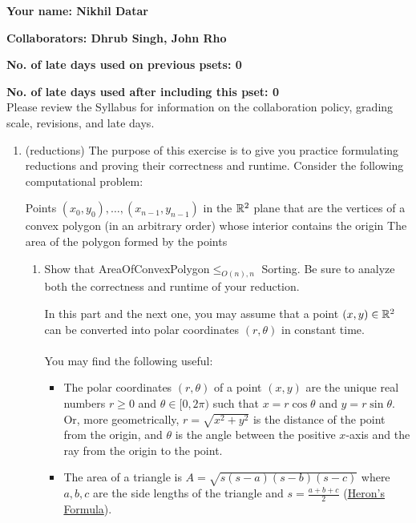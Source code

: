 \documentclass[11pt]{article}
\begin{document}

\textbf{Your name: Nikhil Datar}

\textbf{Collaborators: Dhrub Singh, John Rho}

\textbf{No. of late days used on previous psets: 0}

\textbf{No. of late days used after including this pset: 0}
\\

Please review the Syllabus for information on the collaboration 
policy, grading scale, revisions, and late days.


\begin{enumerate}
     \item  (reductions) The purpose of this exercise is to give you practice formulating reductions and proving their correctness and runtime.
    Consider the following computational problem:

    {Points $(x_0,y_0),\ldots,(x_{n-1},y_{n-1})$ in the $\mathbb{R}^2$ plane that are the vertices of a convex polygon (in an arbitrary order) whose interior contains the origin}
    {The area of the polygon formed by the points}


    \begin{enumerate}
        \item \label{part:polar} 
        Show that AreaOfConvexPolygon$\leq_{O(n),n}$ Sorting.  Be sure to analyze both the correctness and runtime of your reduction.

        In this part and the next one, you may assume that a point $(x,y)\in \mathbb{R}^2$ can be converted into polar coordinates $(r,\theta)$ in constant time. 
        \\\\
        You may find the following useful:
        \begin{itemize}
            \item The polar coordinates $(r,\theta)$ of a point $(x,y)$ are the unique real numbers $r\geq 0$ and $\theta\in [0,2\pi)$ such that $x=r\cos \theta$ and $y=r\sin \theta$. Or, more geometrically, $r=\sqrt{x^2+y^2}$ is the distance of the point from the origin, and $\theta$ is the angle between the positive $x$-axis and the ray from the origin to the point.
            \item The area of a triangle is $A = \sqrt{s(s-a)(s-b)(s-c)}$ where $a, b, c$ are the side lengths of the triangle and $s = \frac{a + b + c}{2}$ (\href{https://en.wikipedia.org/wiki/Heron\%27s_formula}{Heron's Formula}).
        \end{itemize} \\
        

\end{enumerate}
\end{enumerate}
\end{document}
